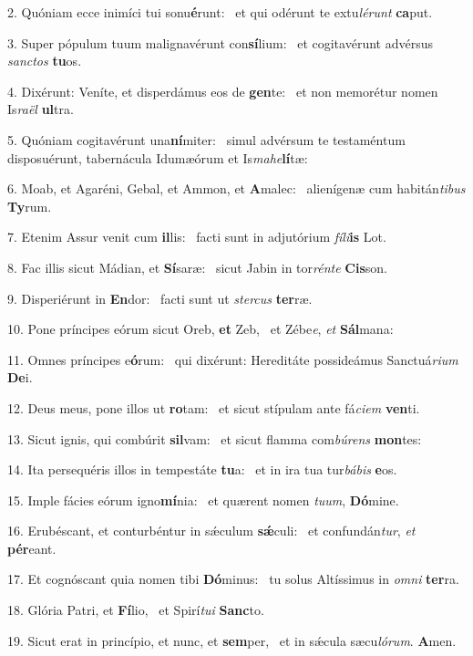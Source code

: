 2. Quóniam ecce inimíci tui sonu\textbf{é}runt: \ast\  et qui odérunt te extu\textit{lé}\textit{runt} \textbf{ca}put.\

3. Super pópulum tuum malignavérunt con\textbf{sí}lium: \ast\  et cogitavérunt advérsus \textit{sanc}\textit{tos} \textbf{tu}os.\

4. Dixérunt: Veníte, et disperdámus eos de \textbf{gen}te: \ast\  et non memorétur nomen Is\textit{ra}\textit{ël} \textbf{ul}tra.\

5. Quóniam cogitavérunt una\textbf{ní}miter: \ast\  simul advérsum te testaméntum disposuérunt, tabernácula Idumæórum et Is\textit{ma}\textit{he}\textbf{lí}tæ:\

6. Moab, et Agaréni, Gebal, et Ammon, et \textbf{A}malec: \ast\  alienígenæ cum habitán\textit{ti}\textit{bus} \textbf{Ty}rum.\

7. Etenim Assur venit cum \textbf{il}lis: \ast\  facti sunt in adjutórium \textit{fí}\textit{li}\textbf{is} Lot.\

8. Fac illis sicut Mádian, et \textbf{Sí}saræ: \ast\  sicut Jabin in tor\textit{rén}\textit{te} \textbf{Cis}son.\

9. Disperiérunt in \textbf{En}dor: \ast\  facti sunt ut \textit{ster}\textit{cus} \textbf{ter}ræ.\

10. Pone príncipes eórum sicut Oreb, \textbf{et} Zeb, \ast\  et Zébe\textit{e}, \textit{et} \textbf{Sál}mana:\

11. Omnes príncipes e\textbf{ó}rum: \ast\  qui dixérunt: Hereditáte possideámus Sanctuá\textit{ri}\textit{um} \textbf{De}i.\

12. Deus meus, pone illos ut \textbf{ro}tam: \ast\  et sicut stípulam ante fá\textit{ci}\textit{em} \textbf{ven}ti.\

13. Sicut ignis, qui combúrit \textbf{sil}vam: \ast\  et sicut flamma com\textit{bú}\textit{rens} \textbf{mon}tes:\

14. Ita persequéris illos in tempestáte \textbf{tu}a: \ast\  et in ira tua tur\textit{bá}\textit{bis} \textbf{e}os.\

15. Imple fácies eórum igno\textbf{mí}nia: \ast\  et quærent nomen \textit{tu}\textit{um}, \textbf{Dó}mine.\

16. Erubéscant, et conturbéntur in sǽculum \textbf{sǽ}culi: \ast\  et confundán\textit{tur}, \textit{et} \textbf{pér}eant.\

17. Et cognóscant quia nomen tibi \textbf{Dó}minus: \ast\  tu solus Altíssimus in \textit{om}\textit{ni} \textbf{ter}ra.\

18. Glória Patri, et \textbf{Fí}lio, \ast\  et Spirí\textit{tu}\textit{i} \textbf{Sanc}to.\

19. Sicut erat in princípio, et nunc, et \textbf{sem}per, \ast\  et in sǽcula sæcu\textit{ló}\textit{rum}. \textbf{A}men.\


